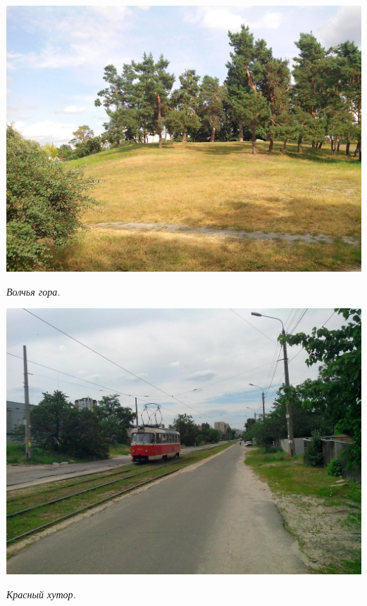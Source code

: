 \vspace*{\fill}

\newpage

\begin{center}
\includegraphics[width=0.95\linewidth]{lpix/IMG_20140817_161555.jpg}

\textit{Волчья гора.}
\end{center}

\begin{center}
\includegraphics[width=\linewidth]{lpix/IMG_20160613_152358.jpg}

\textit{Красный хутор.}
\end{center}

\newpage

